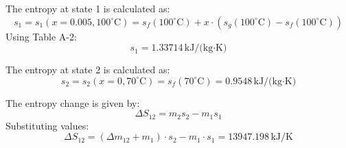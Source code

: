 The entropy at state 1 is calculated as:  
\[
s_1 = s_1(x = 0.005, 100^\circ\text{C}) = s_f(100^\circ\text{C}) + x \cdot (s_g(100^\circ\text{C}) - s_f(100^\circ\text{C}))
\]  
Using Table A-2:  
\[
s_1 = 1.33714 \, \text{kJ/(kg·K)}
\]  

The entropy at state 2 is calculated as:  
\[
s_2 = s_2(x = 0, 70^\circ\text{C}) = s_f(70^\circ\text{C}) = 0.9548 \, \text{kJ/(kg·K)}
\]  

The entropy change is given by:  
\[
\Delta S_{12} = m_2 s_2 - m_1 s_1
\]  
Substituting values:  
\[
\Delta S_{12} = (\Delta m_{12} + m_1) \cdot s_2 - m_1 \cdot s_1 = 13947.198 \, \text{kJ/K}
\]
